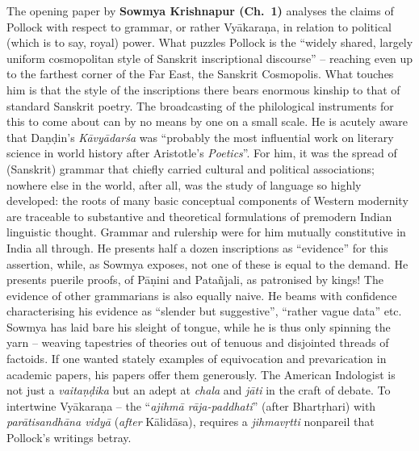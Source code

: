 The opening paper by {\bf Sowmya Krishnapur (Ch.~1)} analyses the claims of Pollock with respect to grammar, or rather Vyākaraṇa, in relation to political (which is to say, royal) power. What puzzles Pollock is the “widely shared, largely uniform cosmopolitan style of Sanskrit inscriptional discourse” -- reaching even up to the farthest corner of the Far East, the Sanskrit Cosmopolis. What touches him is that the style of the inscriptions there bears enormous kinship to that of standard Sanskrit poetry. The broadcasting of the philological instruments for this to come about can by no means by one on a small scale. He is acutely aware that Daṇḍin’s {\sl Kāvyādarśa} was “probably the most influential work on literary science in world history after Aristotle’s {\sl Poetics}”. For him, it was the spread of (Sanskrit) grammar that chiefly carried cultural and political associations; nowhere else in the world, after all, was the study of language so highly developed: the roots of many basic conceptual components of Western modernity are traceable to substantive and theoretical formulations of premodern Indian linguistic thought. Grammar and rulership were for him mutually constitutive in India all through. He presents half a dozen inscriptions as “evidence” for this assertion, while, as Sowmya exposes, not one of these is equal to the demand. He presents puerile proofs, of Pāṇini and Patañjali, as patronised by kings! The evidence of other grammarians is also equally naive. He beams with confidence characterising his evidence as “slender but suggestive”, “rather vague data” etc. Sowmya has laid bare his sleight of tongue, while he is thus only spinning the yarn – weaving tapestries of theories out of tenuous and disjointed threads of factoids. If one wanted stately examples of equivocation and prevarication in academic papers, his papers offer them generously. The American Indologist is not just a {\sl vaitaṇḍika} but an adept at {\sl chala} and {\sl jāti} in the craft of debate. To intertwine Vyākaraṇa -- the “{\sl ajihmā rāja-paddhati}” (after Bhartṛhari) with {\sl parātisandhāna vidyā} ({\sl after} Kālidāsa), requires a {\sl jihmavṛtti} nonpareil that Pollock’s writings betray.

